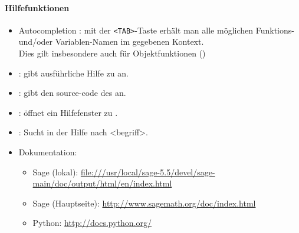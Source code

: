 \documentclass[a4paper,9pt,DIV15,twocolumn]{scrartcl}
\begin{document}
\paragraph{Hilfefunktionen}
\begin{itemize}
\item {\color{blue} Autocompletion :} mit der {\color{blue} \verb~<TAB>~}-Taste erhält man alle möglichen Funktions- und/oder Variablen-Namen im gegebenen Kontext.\\
Dies gilt insbesondere auch für Objektfunktionen ()
\item {\color{blue}  :} gibt ausführliche Hilfe zu  an.
\item {\color{blue}  :} gibt den source-code des  an.
\item {\color{blue}  :} öffnet ein Hilfefenster zu .
\item {\color{blue}  :} Sucht in der Hilfe nach <begriff>.
\item Dokumentation:
\begin{itemize}
    \item Sage (lokal): {\small\url{file:///usr/local/sage-5.5/devel/sage-main/doc/output/html/en/index.html}}
    \item Sage (Hauptseite): {\small\url{http://www.sagemath.org/doc/index.html}}
\item Python: \url{http://docs.python.org/}
\end{itemize}
\end{itemize}
\end{document}

